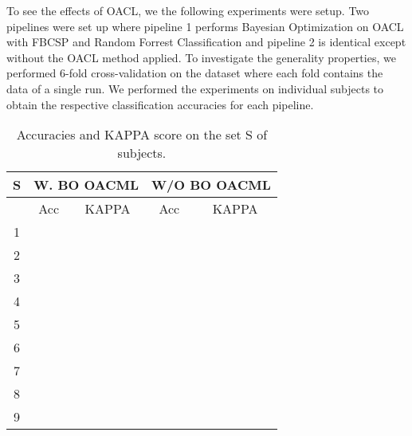 To see the effects of OACL, we the following experiments were setup. Two pipelines were set up where pipeline 1 performs Bayesian Optimization on OACL with FBCSP and Random Forrest Classification and pipeline 2 is identical except without the OACL method applied.
To investigate the generality properties, we performed 6-fold cross-validation on the dataset where each fold contains the data of a single run. We performed the experiments on individual subjects to obtain the respective classification accuracies for each pipeline.
\begin{table}[H]
	\centering
	\caption{Accuracies and KAPPA score on the set S of subjects.}
	\label{fig:results}
	\begin{tabular}{@{}ccc|cc@{}}
		\toprule
		\textbf{S}             & \multicolumn{2}{c|}{\textbf{W. BO OACML}} & \multicolumn{2}{c}{\textbf{W/O BO OACML}} \\ \midrule
		\multicolumn{1}{c|}{}  & Acc                   & KAPPA             & Acc                   & KAPPA             \\ \midrule
		\multicolumn{1}{c|}{1} &                       &                   &                       &                   \\
		\multicolumn{1}{c|}{2} &                       &                   &                       &                   \\
		\multicolumn{1}{c|}{3} &                       &                   &                       &                   \\
		\multicolumn{1}{c|}{4} &                       &                   &                       &                   \\
		\multicolumn{1}{c|}{5} & \textbf{}             &                   & \textbf{}             &                   \\
		\multicolumn{1}{c|}{6} &                       &                   &                       &                   \\
		\multicolumn{1}{c|}{7} &                       &                   &                       &                   \\
		\multicolumn{1}{c|}{8} &                       &                   &                       &                   \\
		\multicolumn{1}{c|}{9} &                       &                   &                       &                   \\ \bottomrule
	\end{tabular}
\end{table}
